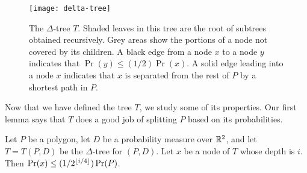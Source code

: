 \documentclass[acmtalg]{acmsmall}
\begin{document}
\begin{figure}
 \begin{center}\texttt{[image: delta-tree]}\end{center}
   \caption{The $\Delta$-tree $T$.  Shaded leaves in this tree are the
     root of subtrees obtained recursively.  Grey areas show the
portions of a node not covered by its children. 
A black edge from a node $x$ to a node $y$ indicates that $\Pr(y)\le
(1/2)\Pr(x)$.  A solid edge leading into a node $x$ indicates that $x$
is separated from the rest of $P$ by a shortest path in $P$.}
\end{figure}

Now that we have defined the tree $T$, we study some of its
properties.  Our first lemma says that $T$ does a good job of
splitting $P$ based on its probabilities.

\begin{lem}
Let $P$ be a polygon, let $D$ be a probability measure over $\mathbb{R}^2$, 
and let $T=T(P,D)$ be the $\Delta$-tree for $(P,D)$.
Let $x$ be a node of $T$ whose depth is $i$. Then $\Pr(x) \le
(1/2^{{\left\lfloor i/4 \right\rfloor}})\Pr(P)$.
\end{lem}
\end{document}
